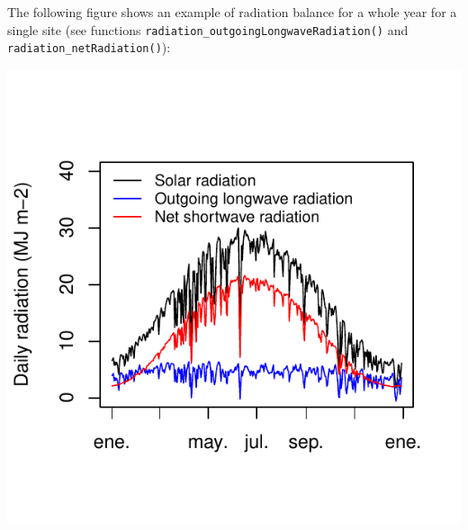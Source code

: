 \documentclass[11pt,a4paper]{article}
\begin{document}
The following figure shows an example of radiation balance for a whole year for a single site (see functions \texttt{radiation\_outgoingLongwaveRadiation()} and \texttt{radiation\_netRadiation()}):
\begin{center}
\includegraphics{Meteorology-016}
\end{center}
\end{document}
